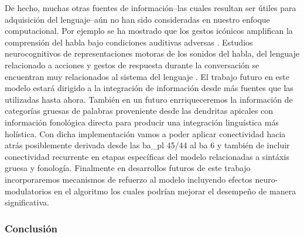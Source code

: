 De hecho, muchas otras fuentes de información--las cuales resultan ser útiles para adquisición del lenguaje--aún no han sido consideradas en nuestro enfoque computacional.
Por ejemplo se ha mostrado que los gestos icónicos amplifican la comprensión del habla bajo condiciones auditivas adversas \cite{HOLLE2010875}.
Estudios neurocognitivos de representaciones motoras de los sonidos del habla, del lenguaje relacionado a acciones y gestos de respuesta durante la conversación se encuentran muy relacionados al sistema del lenguaje \cite{Willems2007NeuralEF}.
El trabajo futuro en este modelo estará dirigido a la integración de información desde más fuentes que las utilizadas hasta ahora.
También en un futuro enrriqueceremos la información de categorías gruesas de palabras proveniente desde las dendritas apicales con información fonológica directa para producir una integración linguística más holística.
Con dicha implementación vamos a poder aplicar conectividad hacia atrás posiblemente derivada desde las \gls{ba_pl} 45/44 al \gls{ba} 6 y también de incluir conectividad recurrente en etapas específicas del modelo relacionadas a sintáxis gruesa y fonología.
Finalmente en desarrollos futuros de este trabajo incorporaremos mecanismos de refuerzo al modelo incluyendo efectos neuro-modulatorios en el algoritmo los cuales podrían mejorar el desempeño de manera significativa.











\subsubsection{Conclusión}

